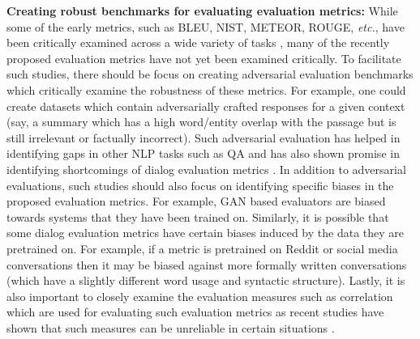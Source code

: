 \noindent \textbf{Creating robust benchmarks for evaluating evaluation metrics:} While some of the early metrics, such as BLEU, NIST, METEOR, ROUGE, \textit{etc.}, have been critically examined across a wide variety of tasks , many of the recently proposed evaluation metrics have not yet been examined critically. To facilitate such studies, there should be focus on creating adversarial evaluation benchmarks which critically examine the robustness of these metrics. For example, one could create datasets which contain adversarially crafted responses for a given context (say, a summary which has a high word/entity overlap with the passage but is still irrelevant or factually incorrect). Such adversarial evaluation has helped in identifying gaps in other NLP tasks such as QA  and has also shown promise in identifying shortcomings of dialog evaluation metrics . In addition to adversarial evaluations, such studies should also focus on identifying specific biases in the proposed evaluation metrics. For example, GAN based evaluators  are biased towards systems that they have been trained on. Similarly, it is possible that some dialog evaluation metrics have certain biases induced by the data they are pretrained on. For example, if a metric is pretrained on Reddit or social media conversations then it may be biased against more formally written conversations (which have a slightly different word usage and syntactic structure). Lastly, it is also important to closely examine the evaluation measures such as correlation which are used for evaluating such evaluation metrics as recent studies have shown that such measures can be unreliable in certain situations .

